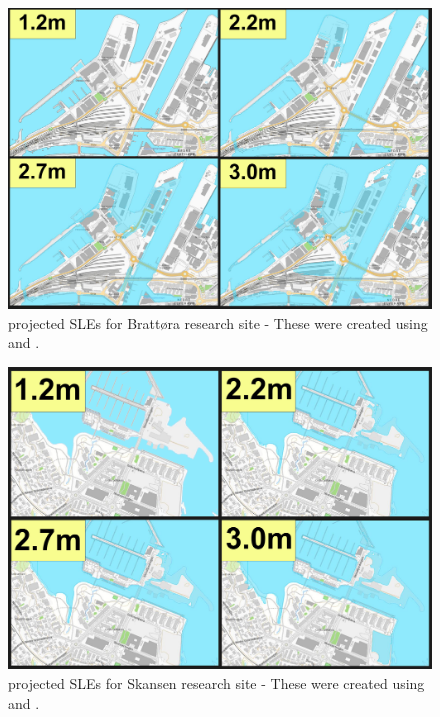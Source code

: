 \begin{figure}[H]
    \centering
    \includegraphics[width=16cm]{fig_sle/brattora-sle-num.png}
    \caption{projected SLEs for Brattøra research site - These were created using \cite{kartverket_se_2021} and \cite{stormflo_database_stormflo_2021}. }
    \label{fig:sle_brattora_num}
\end{figure}

\begin{figure}[H]
    \centering
    \includegraphics[width=16cm]{fig_sle/grillstad-sle-num.png}
    \caption{projected SLEs for Skansen research site - These were created using \cite{kartverket_se_2021} and \cite{stormflo_database_stormflo_2021}. }
    \label{fig:sle_grillstad_num}
\end{figure}

